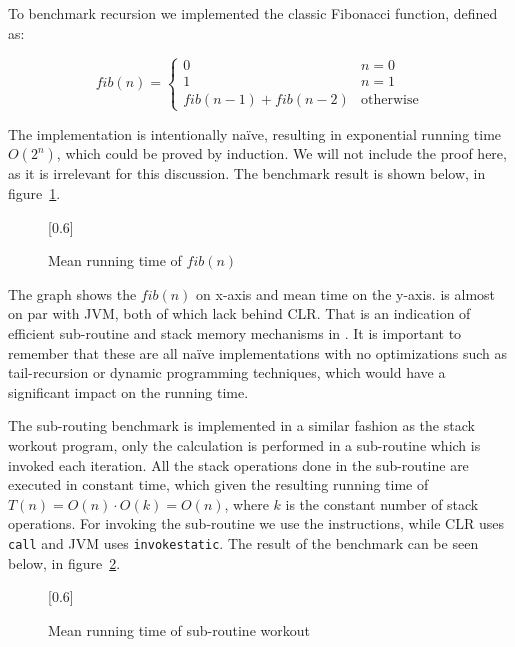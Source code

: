 
To benchmark recursion we implemented the classic Fibonacci function, defined
as:

\begin{equation*}
  fib(n) = \begin{cases}
    0                   & n = 0 \\
    1                   & n = 1 \\
    fib(n-1) + fib(n-2) & \text{otherwise}
  \end{cases}
\end{equation*}

The implementation is intentionally na\"ive, resulting in exponential running
time $O(2^n)$, which could be proved by induction. We will not include the proof
here, as it is irrelevant for this discussion. The benchmark result is shown
below, in figure~\ref{fig:eval:benchmark:fib}.

\begin{figure}[H]
  \centering
  \scalebox{0.8}[0.6]{}
  \caption{Mean running time of $fib(n)$}
\label{fig:eval:benchmark:fib}
\end{figure}

The graph shows the $fib(n)$ on x-axis and mean time on the y-axis. \thename{}
is almost on par with JVM, both of which lack behind CLR. That is an indication
of efficient sub-routine and stack memory mechanisms in \thename{}. It is
important to remember that these are all na\"ive implementations with no
optimizations such as tail-recursion or dynamic programming techniques, which
would have a significant impact on the running time.


The sub-routing benchmark is implemented in a similar fashion as the stack
workout program, only the calculation is performed in a sub-routine which is
invoked each iteration. All the stack operations done in the sub-routine are
executed in constant time, which given the resulting running time of
$T(n) = O(n) \cdot O(k) = O(n)$, where $k$ is the constant number of stack
operations. For invoking the sub-routine we use the  instructions,
while CLR uses {\tt call} and JVM uses {\tt invokestatic}. The result of the
benchmark can be seen below, in figure~\ref{fig:eval:benchmark:invoc}.

\begin{figure}[H]
  \centering
  \scalebox{0.8}[0.6]{}
  \caption{Mean running time of sub-routine workout}
\label{fig:eval:benchmark:invoc}
\end{figure}

